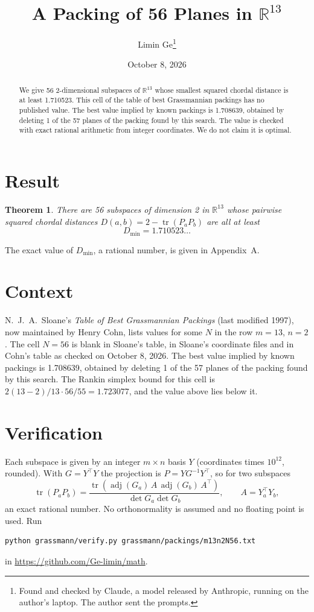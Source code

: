 \documentclass[11pt,a4paper]{article}
\title{A Packing of 56 Planes in $\mathbb{R}^{13}$}
\author{Limin Ge\thanks{Found and checked by Claude, a model released by Anthropic, running on the author's laptop. The author sent the prompts.}}
\date{October 8, 2026}
\newtheorem*{theorem}{Theorem}
\begin{document}
\maketitle
\begin{abstract}
We give 56 2-dimensional subspaces of $\mathbb{R}^{13}$ whose smallest squared chordal distance is at least 1.710523. This cell of the table of best Grassmannian packings has no published value. The best value implied by known packings is 1.708639, obtained by deleting 1 of the 57 planes of the packing found by this search. The value is checked with exact rational arithmetic from integer coordinates. We do not claim it is optimal.
\end{abstract}

\section{Result}
\begin{theorem}
There are 56 subspaces of dimension 2 in $\mathbb{R}^{13}$ whose pairwise squared chordal distances $D(a,b) = 2 - \operatorname{tr}(P_aP_b)$ are all at least
\[ D_{\min} = 1.710523\ldots \]
\end{theorem}
The exact value of $D_{\min}$, a rational number, is given in Appendix~A.


\section{Context}
N.~J.~A.~Sloane's \emph{Table of Best Grassmannian Packings} (last modified 1997), now maintained by Henry Cohn, lists values for some $N$ in the row $m=13$, $n=2$. The cell $N=56$ is blank in Sloane's table, in Sloane's coordinate files and in Cohn's table as checked on October 8, 2026. The best value implied by known packings is 1.708639, obtained by deleting 1 of the 57 planes of the packing found by this search. The Rankin simplex bound for this cell is $2(13-2)/13\cdot 56/55 = 1.723077$, and the value above lies below it.


\section{Verification}
Each subspace is given by an integer $m\times n$ basis $Y$ (coordinates times $10^{12}$, rounded). With $G=Y^\top Y$ the projection is $P=YG^{-1}Y^\top$, so for two subspaces
\[ \operatorname{tr}(P_aP_b)=\frac{\operatorname{tr}(\operatorname{adj}(G_a)\,A\,\operatorname{adj}(G_b)\,A^\top)}{\det G_a\det G_b},\qquad A=Y_a^\top Y_b, \]
an exact rational number. No orthonormality is assumed and no floating point is used. Run
\begin{verbatim}
python grassmann/verify.py grassmann/packings/m13n2N56.txt
\end{verbatim}
in \url{https://github.com/Ge-limin/math}.
\end{document}

